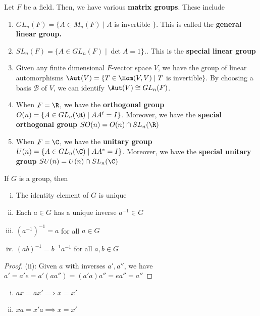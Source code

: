 \begin{ex}
    Let $F$ be a field. Then, we have various \textbf{matrix groups}. These include
    \begin{enumerate}
        \item $GL_n(F) = \{ A \in M_n(F) \mid A$ is invertible $\}$. This is called the \textbf{general linear group.}
        \item $SL_n(F) = \{ A \in GL_n(F) \mid \det A = 1\}.$. This is the \textbf{special linear group}
        \item Given any finite dimensional $F$-vector space $V$, we have the group of linear automorphisms $\Aut(V)=\{T \in \Hom(V,V) \mid T$ is invertible$\}$. By choosing a basis $\mathcal B$ of $V$, we can identify $\Aut (V) \cong GL_n(F)$.
        \item When $F=\R$, we have the \textbf{orthogonal group} $O(n) = \{ A \in GL_n(\R) \mid AA^t=I\}$. Moreover, we have the \textbf{special orthogonal group}  $SO(n)= O(n) \cap SL_n(\R)$
        \item When $F = \C$, we have the \textbf{unitary group} $U(n) = \{A \in GL_n(\C) \mid AA^*=I\}$. Moreover, we have the \textbf{special unitary group} $SU(n) = U(n) \cap SL_n(\C)$
    \end{enumerate}
\end{ex}

\begin{prop}
    If $G$ is a group, then
    \hfill
    \begin{enumerate}[(i)]
        \item The identity element of $G$ is unique
        \item Each $a \in G$ has a unique inverse $a^{-1} \in G$
        \item $(a^{-1})^{-1}=a$ for all $a \in G$
        \item $(ab)^{-1}=b^{-1}a^{-1}$ for all $a,b \in G$
    \end{enumerate}
\end{prop}

\begin{proof}

    (ii): Given $a$ with inverses $a',a''$, we have $a' = a'e = a'(a a'')=(a'a)a''=ea''=a''$
\end{proof}

\begin{prop}
    \begin{enumerate}[(i)]
        \item $ax=ax' \implies x=x'$
        \item $xa=x'a \implies x=x'$
    \end{enumerate}
\end{prop}

